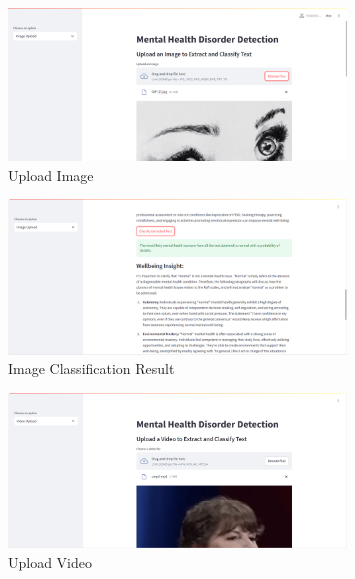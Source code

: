 \pagebreak

\begin{figure}[h!]  
    \centering
    \includegraphics[width=0.8\textwidth]{App Images/04 Interface.png}  
    \caption{Upload Image}
    \label{04i}  %
\end{figure}

\begin{figure}[h!]  
    \centering
    \includegraphics[width=0.8\textwidth]{App Images/05 Interface.png}  
    \caption{Image Classification Result}
    \label{05i}  %
\end{figure}


\begin{figure}[h!]  
    \centering
    \includegraphics[width=0.8\textwidth]{App Images/12 Interface.png}  
    \caption{Upload Video}
    \label{06i4}  %
\end{figure}

\pagebreak

